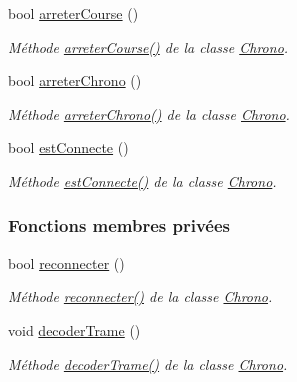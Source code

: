 \begin{DoxyCompactItemize}
bool \hyperlink{class_chrono_a2a0d899b09eb044caa83b41574ac5edf}{arreter\+Course} ()
\begin{DoxyCompactList}\small\item\em Méthode \hyperlink{class_chrono_a2a0d899b09eb044caa83b41574ac5edf}{arreter\+Course()} de la classe \hyperlink{class_chrono}{Chrono}. \end{DoxyCompactList}\item 
bool \hyperlink{class_chrono_a5e2781ab78dcaa0ecb37e301399d819b}{arreter\+Chrono} ()
\begin{DoxyCompactList}\small\item\em Méthode \hyperlink{class_chrono_a5e2781ab78dcaa0ecb37e301399d819b}{arreter\+Chrono()} de la classe \hyperlink{class_chrono}{Chrono}. \end{DoxyCompactList}\item 
bool \hyperlink{class_chrono_aaad6d9079f2de1c09092f97614009f62}{est\+Connecte} ()
\begin{DoxyCompactList}\small\item\em Méthode \hyperlink{class_chrono_aaad6d9079f2de1c09092f97614009f62}{est\+Connecte()} de la classe \hyperlink{class_chrono}{Chrono}. \end{DoxyCompactList}\end{DoxyCompactItemize}
\subsubsection*{Fonctions membres privées}
\begin{DoxyCompactItemize}
\item 
bool \hyperlink{class_chrono_a80305a5dae33e8cd99604e809589564b}{reconnecter} ()
\begin{DoxyCompactList}\small\item\em Méthode \hyperlink{class_chrono_a80305a5dae33e8cd99604e809589564b}{reconnecter()} de la classe \hyperlink{class_chrono}{Chrono}. \end{DoxyCompactList}\item 
void \hyperlink{class_chrono_a9a66b4e81385e2c354805548b94cdfb6}{decoder\+Trame} ()
\begin{DoxyCompactList}\small\item\em Méthode \hyperlink{class_chrono_a9a66b4e81385e2c354805548b94cdfb6}{decoder\+Trame()} de la classe \hyperlink{class_chrono}{Chrono}. \end{DoxyCompactList}\end{DoxyCompactItemize}
